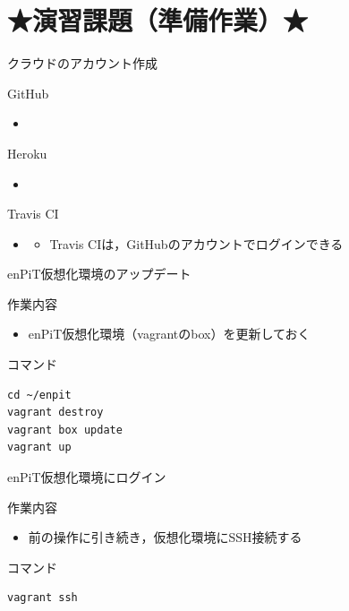 \documentclass[t, aspectratio=169]{beamer}
\begin{document}
\section{★演習課題（準備作業）★}
\label{sec-1-5}
\begin{frame}[label=sec-1-5-1]{クラウドのアカウント作成}
\begin{block}{GitHub}
\begin{itemize}
\item{}
\end{itemize}
\end{block}
\begin{block}{Heroku}
\begin{itemize}
\item{}
\end{itemize}
\end{block}
\begin{block}{Travis CI}
\begin{itemize}
\item{}
\begin{itemize}
\item Travis CIは，GitHubのアカウントでログインできる
\end{itemize}
\end{itemize}
\end{block}
\end{frame}
\begin{frame}[fragile,label=sec-1-5-2]{enPiT仮想化環境のアップデート}
 \begin{block}{作業内容}
\begin{itemize}
\item enPiT仮想化環境（vagrantのbox）を更新しておく
\end{itemize}
\end{block}
\begin{block}{コマンド}
\begin{verbatim}
cd ~/enpit
vagrant destroy
vagrant box update
vagrant up
\end{verbatim}
\end{block}
\end{frame}

\begin{frame}[fragile,label=sec-1-5-3]{enPiT仮想化環境にログイン}
 \begin{block}{作業内容}
\begin{itemize}
\item 前の操作に引き続き，仮想化環境にSSH接続する
\end{itemize}
\end{block}
\begin{block}{コマンド}
\begin{verbatim}
vagrant ssh
\end{verbatim}
\end{block}
\end{frame}
\end{document}
